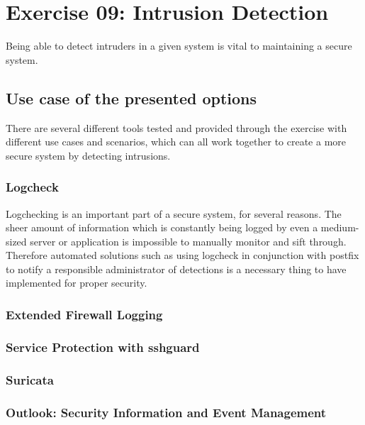 \section{Exercise 09: Intrusion Detection}
Being able to detect intruders in a given system is vital to maintaining a secure system.
\subsection{Use case of the presented options}
There are several different tools tested and provided through the exercise with different use cases and scenarios, which can all work together to create a more secure system by detecting intrusions.
\subsubsection{Logcheck}
Logchecking is an important part of a secure system, for several reasons. The sheer amount of information which is constantly being logged by even a medium-sized server or application is impossible to manually monitor and sift through. Therefore automated solutions such as using logcheck in conjunction with postfix to notify a responsible administrator of detections is a necessary thing to have implemented for proper security.

\subsubsection{Extended Firewall Logging}


\subsubsection{Service Protection with sshguard}


\subsubsection{Suricata}


\subsubsection{Outlook: Security Information and Event Management}
